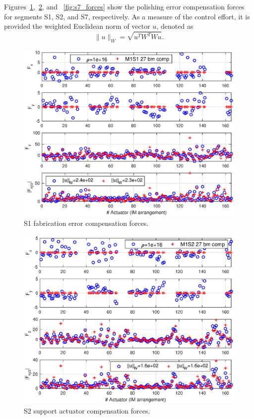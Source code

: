 \documentclass{gmto}
\begin{document}
Figures~\ref{fig:s1_forces},~\ref{fig:s2_forces}, and ~\ref{fig:s7_forces} show the polishing error compensation forces for segments \textsf{S1}, \textsf{S2}, and \textsf{S7}, respectively. As a measure of the control effort, it is provided the weighted Euclidean norm of vector $u$, denoted as \[
\|u\|_W = \sqrt{u^T W^T W u} .
\]
%
\begin{figure}[!htb]
\centering
\includegraphics[width=\textwidth]{./pictures/s1_comp_Forces.eps}
\caption{\textsf{S1} fabrication error compensation forces.}
\label{fig:s1_forces}
\end{figure}
\begin{figure}[!htb]
\centering
\includegraphics[width=\textwidth]{./pictures/s2_comp_Forces.eps}
\caption{\textsf{S2} support actuator compensation forces.}
\label{fig:s2_forces}
\end{figure}
\end{document}
